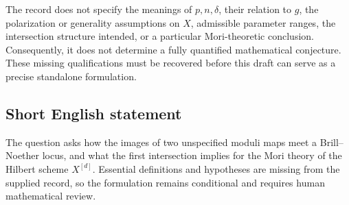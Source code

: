 \documentclass[11pt]{article}
\begin{document}
The record does not specify the meanings of \(p,n,\delta\), their relation to \(g\), the polarization or generality assumptions on \(X\), admissible parameter ranges, the intersection structure intended, or a particular Mori-theoretic conclusion. Consequently, it does not determine a fully quantified mathematical conjecture. These missing qualifications must be recovered before this draft can serve as a precise standalone formulation.
\subsection{Short English statement}
The question asks how the images of two unspecified moduli maps meet a Brill--Noether locus, and what the first intersection implies for the Mori theory of the Hilbert scheme \(X^{[d]}\). Essential definitions and hypotheses are missing from the supplied record, so the formulation remains conditional and requires human mathematical review.
\end{document}
